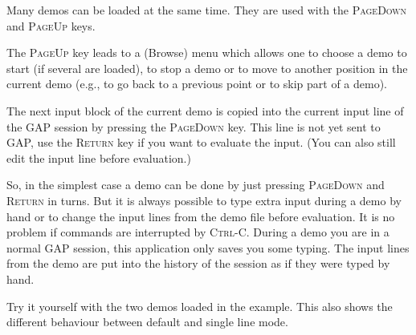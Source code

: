 \documentclass[a4paper,11pt]{report}
\begin{document}
{{ Many demos can be loaded at the same time. They are used with the \textsc{PageDown} and \textsc{PageUp} keys. 

 The \textsc{PageUp} key leads to a (Browse) menu which allows one to choose a demo to start (if
several are loaded), to stop a demo or to move to another position in the
current demo (e.g., to go back to a previous point or to skip part of a demo). 

 The next input block of the current demo is copied into the current input line
of the \textsf{GAP} session by pressing the \textsc{PageDown} key. This line is not yet sent to \textsf{GAP}, use the \textsc{Return} key if you want to evaluate the input. (You can also still edit the input line
before evaluation.) 

 So, in the simplest case a demo can be done by just pressing \textsc{PageDown} and \textsc{Return} in turns. But it is always possible to type extra input during a demo by hand
or to change the input lines from the demo file before evaluation. It is no
problem if commands are interrupted by \textsc{Ctrl-C}. During a demo you are in a normal \textsf{GAP} session, this application only saves you some typing. The input lines from the
demo are put into the history of the session as if they were typed by hand. 

 Try it yourself with the two demos loaded in the example. This also shows the
different behaviour between default and single line mode. }

 }

 

\appendix
\end{document}
